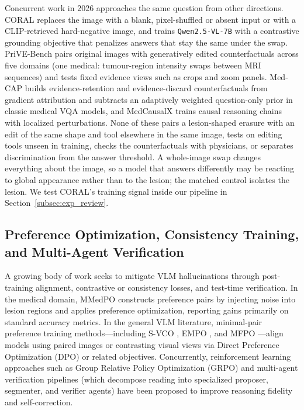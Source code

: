 \documentclass[5p,times,twocolumn,authoryear]{elsarticle}
\begin{document}
Concurrent work in 2026 approaches the same question from other directions. CORAL \citep{zafar2026coral} replaces the image with a blank, pixel-shuffled or absent input or with a CLIP-retrieved hard-negative image, and trains \texttt{Qwen2.5-VL-7B} with a contrastive grounding objective that penalizes answers that stay the same under the swap. PriVE-Bench \citep{sun2026prive} pairs original images with generatively edited counterfactuals across five domains (one medical: tumour-region intensity swaps between MRI sequences) and tests fixed evidence views such as crops and zoom panels. Med-CAP \citep{huang2026medcap} builds evidence-retention and evidence-discard counterfactuals from gradient attribution and subtracts an adaptively weighted question-only prior in classic medical VQA models, and MedCausalX \citep{lin2026medcausalx} trains causal reasoning chains with localized perturbations. None of these pairs a lesion-shaped erasure with an edit of the same shape and tool elsewhere in the same image, tests on editing tools unseen in training, checks the counterfactuals with physicians, or separates discrimination from the answer threshold. A whole-image swap changes everything about the image, so a model that answers differently may be reacting to global appearance rather than to the lesion; the matched control isolates the lesion. We test CORAL's training signal inside our pipeline in Section~\ref{subsec:exp_review}.

\subsection{Preference Optimization, Consistency Training, and Multi-Agent Verification}
\label{subsec:rw_alignment}
A growing body of work seeks to mitigate VLM hallucinations through post-training alignment, contrastive or consistency losses, and test-time verification. In the medical domain, MMedPO \citep{zhu2024mmedpo} constructs preference pairs by injecting noise into lesion regions and applies preference optimization, reporting gains primarily on standard accuracy metrics. In the general VLM literature, minimal-pair preference training methods---including S-VCO \citep{svco2024}, EMPO \citep{wu2025empo}, and MFPO \citep{jiang2025mfpo}---align models using paired images or contrasting visual views via Direct Preference Optimization (DPO) \citep{rafailov2023dpo} or related objectives. Concurrently, reinforcement learning approaches such as Group Relative Policy Optimization (GRPO) \citep{shao2024deepseekmath} and multi-agent verification pipelines (which decompose reading into specialized proposer, segmenter, and verifier agents) have been proposed to improve reasoning fidelity and self-correction.
\end{document}
